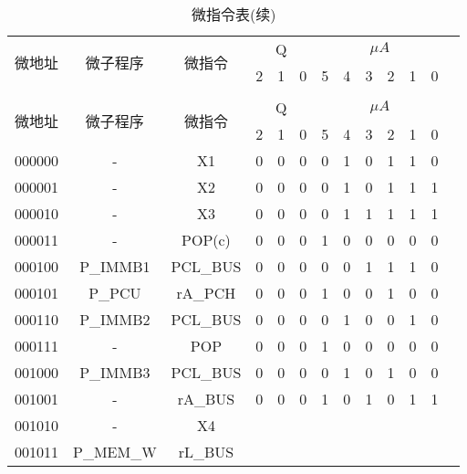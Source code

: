 \documentclass[10pt]{book}
\begin{document}
\begin{longtable}{|c|c|c||c|c|c||c|c|c|c|c|c|c|}
\caption{微指令表} \label{tb_micro_prog3} \\
\hline
\multirow{2}{1.5cm}{微地址} & \multirow{2}{1.5cm}{微子程序} & \multirow{2}{1.5cm}{微指令} & \multicolumn{3}{c||}{Q} & \multicolumn {6}{c|}{$\mu A$} \\
\cline{4-12}
                          &           &  & 2 & 1 & 0  & 5 & 4 & 3 & 2 & 1 & 0 \\
\hline
\endfirsthead
\caption{微指令表(续)} \\
\hline
\multirow{2}{1.5cm}{微地址} & \multirow{2}{1.5cm}{微子程序} & \multirow{2}{1.5cm}{微指令} & \multicolumn{3}{c|}{Q} & \multicolumn {6}{c|}{$\mu A$} \\
\cline{4-12}
                          &           &  & 2 & 1 & 0  & 5 & 4 & 3 & 2 & 1 & 0 \\
\hline
\endhead
\hline
\endfoot
000000 & - 		& X1 			& 0 & 0 & 0  & 0 & 1 & 0 & 1 & 1 & 0 \\ %
000001 & - 		& X2 			& 0 & 0 & 0  & 0 & 1 & 0 & 1 & 1 & 1 \\ %
000010 & - 		& X3			& 0 & 0 & 0  & 0 & 1 & 1 & 1 & 1 & 1 \\ %
000011 & - 		& POP(c) 		& 0 & 0 & 0  & 1 & 0 & 0 & 0 & 0 & 0 \\ %
000100 & P\_IMMB1 	& PCL\_BUS 	& 0 & 0 & 0  & 0 & 0 & 1 & 1 & 1 & 0 \\ %
000101 & P\_PCU 	& rA\_PCH		& 0 & 0 & 0  & 1 & 0 & 0 & 1 & 0 & 0 \\ %
000110 & P\_IMMB2 	& PCL\_BUS	 	& 0 & 0 & 0  & 0 & 1 & 0 & 0 & 1 & 0 \\ %
000111 & - 		& POP			& 0 & 0 & 0  & 1 & 0 & 0 & 0 & 0 & 0 \\ %
\hline
001000 & P\_IMMB3 	& PCL\_BUS 	& 0 & 0 & 0  & 0 & 1 & 0 & 1 & 0 & 0 \\ %
001001 & - 		& rA\_BUS  	& 0 & 0 & 0  & 1 & 0 & 1 & 0 & 1 & 1 \\ %
001010 & - 		& X4 			&   &   &    &   &   &   &   &   &   \\
001011 & P\_MEM\_W 	& rL\_BUS 		&   &   &    &   &   &   &   &   &   \\

\end{longtable}
\end{document}
